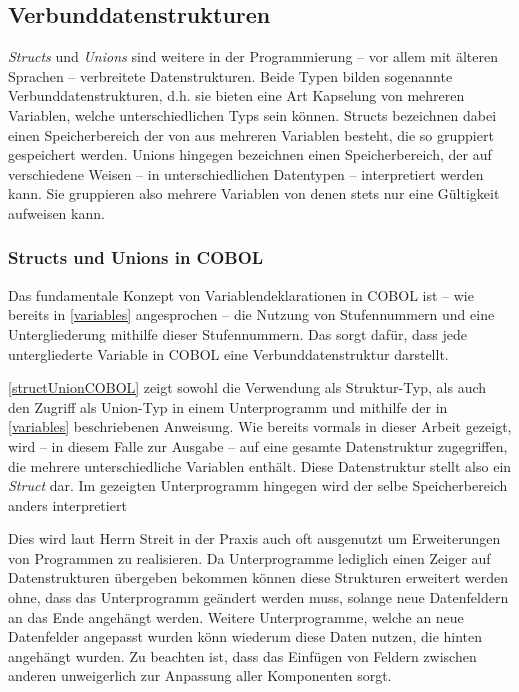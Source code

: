\subsection{Verbunddatenstrukturen}\label{verbunddatenstrukturen}
\textit{Structs} und \textit{Unions} sind weitere in der Programmierung -- vor allem mit älteren Sprachen -- verbreitete Datenstrukturen. Beide Typen bilden sogenannte Verbunddatenstrukturen, d.h. sie bieten eine Art Kapselung von mehreren Variablen, welche unterschiedlichen Typs sein können. Structs bezeichnen dabei einen Speicherbereich der von aus mehreren Variablen besteht, die so gruppiert gespeichert werden. Unions hingegen bezeichnen einen Speicherbereich, der auf verschiedene Weisen -- in unterschiedlichen Datentypen -- interpretiert werden kann. Sie gruppieren also mehrere Variablen von denen stets nur eine Gültigkeit aufweisen kann.

\subsubsection*{Structs und Unions in COBOL}

Das fundamentale Konzept von Variablendeklarationen in COBOL ist -- wie bereits in \autoref{variables} angesprochen -- die Nutzung von Stufennummern und eine Untergliederung mithilfe dieser Stufennummern. Das sorgt dafür, dass jede untergliederte Variable in COBOL eine Verbunddatenstruktur darstellt.


\autoref{structUnionCOBOL} zeigt sowohl die Verwendung als Struktur-Typ, als auch den Zugriff als Union-Typ in einem Unterprogramm und mithilfe der in \autoref{variables} beschriebenen  Anweisung. Wie bereits vormals in dieser Arbeit gezeigt, wird -- in diesem Falle zur Ausgabe -- auf eine gesamte Datenstruktur zugegriffen, die mehrere unterschiedliche Variablen enthält. Diese Datenstruktur stellt also ein \textit{Struct} dar. Im gezeigten Unterprogramm hingegen wird der selbe Speicherbereich anders interpretiert

Dies wird laut Herrn Streit in der Praxis auch oft ausgenutzt um Erweiterungen von Programmen zu realisieren. Da Unterprogramme lediglich einen Zeiger auf Datenstrukturen übergeben bekommen können diese Strukturen erweitert werden ohne, dass das Unterprogramm geändert werden muss, solange neue Datenfeldern an das Ende angehängt werden. Weitere Unterprogramme, welche an neue Datenfelder angepasst wurden könn wiederum diese Daten nutzen, die hinten angehängt wurden. Zu beachten ist, dass das Einfügen von Feldern zwischen anderen unweigerlich zur Anpassung aller Komponenten sorgt.

